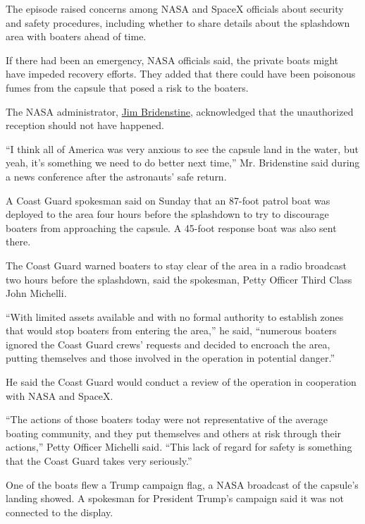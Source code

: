The episode raised concerns among NASA and SpaceX officials about
security and safety procedures, including whether to share details about
the splashdown area with boaters ahead of time.

If there had been an emergency, NASA officials said, the private boats
might have impeded recovery efforts. They added that there could have
been poisonous fumes from the capsule that posed a risk to the boaters.

The NASA administrator,
\href{https://www.google.com/search?rlz=1C5GCEA_enUS904US905\&q=Jim+Bridenstine\&stick=H4sIAAAAAAAAAONgVuLSz9U3yCqvTDEresRoyi3w8sc9YSmdSWtOXmNU4-IKzsgvd80rySypFJLgYoOy-KR4uJC08Sxi5ffKzFVwKspMSc0rLsnMSwUAxtrzGlgAAAA}{Jim
Bridenstine}, acknowledged that the unauthorized reception should not
have happened.

``I think all of America was very anxious to see the capsule land in the
water, but yeah, it's something we need to do better next time,'' Mr.
Bridenstine said during a news conference after the astronauts' safe
return.

A Coast Guard spokesman said on Sunday that an 87-foot patrol boat was
deployed to the area four hours before the splashdown to try to
discourage boaters from approaching the capsule. A 45-foot response boat
was also sent there.

The Coast Guard warned boaters to stay clear of the area in a radio
broadcast two hours before the splashdown, said the spokesman, Petty
Officer Third Class John Michelli.

``With limited assets available and with no formal authority to
establish zones that would stop boaters from entering the area,'' he
said, ``numerous boaters ignored the Coast Guard crews' requests and
decided to encroach the area, putting themselves and those involved in
the operation in potential danger.''

He said the Coast Guard would conduct a review of the operation in
cooperation with NASA and SpaceX.

``The actions of those boaters today were not representative of the
average boating community, and they put themselves and others at risk
through their actions,'' Petty Officer Michelli said. ``This lack of
regard for safety is something that the Coast Guard takes very
seriously.''

One of the boats flew a Trump campaign flag, a NASA broadcast of the
capsule's landing showed. A spokesman for President Trump's campaign
said it was not connected to the display.

